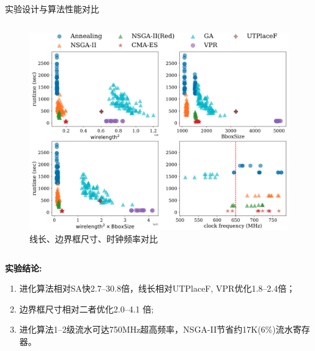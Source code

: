 \documentclass[10pt]{beamer}
\begin{document}
\begin{frame}{实验设计与算法性能对比}
\begin{columns}[T, onlytextwidth]
    \begin{figure}
      \includegraphics[width=1\textwidth]{img/objective-runtime.png}
      \caption{线长、边界框尺寸、时钟频率对比} 
      \label{fig:objective}
    \end{figure}

  \end{columns}

  \vspace{-0.2cm}


  {\fontsize{8}{12}\selectfont

  {\bf 实验结论:}\\
  \begin{enumerate}
    \item 进化算法相对SA快\alert{2.7--30.8}倍，线长相对UTPlaceF, VPR优化\alert{1.8--2.4}倍；
    \item 边界框尺寸相对二者优化\alert{2.0--4.1} 倍;
    \item 进化算法1--2级流水可达750MHz超高频率，NSGA-II节省约17K(6\%)流水寄存器。
  \end{enumerate}
  }





\end{frame}
\end{document}
